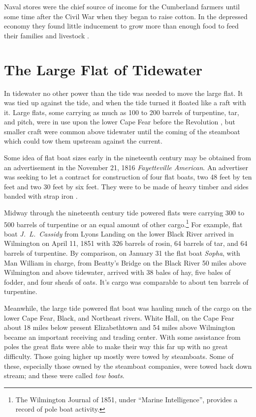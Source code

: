 \documentclass[11pt, a5paper, openright]{book}
\begin{document}
Naval stores were the chief source of income for the Cumberland
farmers until some time after the Civil War when they began to raise
cotton.  In the depressed economy they found little inducement to grow
more than enough food to feed their families and livestock
\citep[432]{oatesja}.\par

\section{The Large Flat of Tidewater}

In tidewater no other power than the tide was needed to move the large
flat.  It was tied up against the tide, and when the tide turned it
floated like a raft with it.  Large flats, some carrying as much as 100
to 200 barrels of turpentine, tar, and pitch, were in use upon the
lower Cape Fear before the Revolution \citep[184-185]{schawj}, but
smaller craft were common above tidewater until the coming of the
steamboat which could tow them upstream against the current.\par

Some idea of flat boat sizes early in the nineteenth century may be
obtained from an advertisement in the November 21, 1816
\textit{Fayetteville American}.  An advertiser was seeking to let a
contract for construction of four flat boats, two 48 feet by ten feet
and two 30 feet by six feet.  They were to be made of heavy timber and
sides banded with strap iron \citep[11-21-16]{fa}.\par

Midway through the nineteenth century tide powered flats were carrying
300 to 500 barrels of turpentine or an equal amount of other
cargo.\footnote{The Wilmington Journal of 1851, under ``Marine
  Intelligence'', provides a record of pole boat activity.}  For
example, flat boat
\textit{J.~L.~Cassidy} from Lyons
Landing on the lower Black River arrived in Wilmington on April 11,
1851 with 326 barrels of rosin, 64 barrels of tar, and 64 barrels
of turpentine.  By comparison, on January 31 the flat boat
\textit{Sopha}, with Man William in charge, from Beatty's Bridge on
the Black River 50 miles above Wilmington and above tidewater, arrived
with 38 bales of hay, five bales of fodder, and four sheafs of oats.
It's cargo was comparable to about ten barrels of turpentine.\par

Meanwhile, the large tide powered flat boat was hauling much of the
cargo on the lower Cape Fear, Black, and Northeast rivers.  White
Hall, on the Cape Fear about 18 miles below present Elizabethtown and
54 miles above Wilmington became an important receiving and trading
center.  With some assistance from poles the great flats were able to
make their way this far up with no great difficulty.  Those going
higher up mostly were towed by steamboats.  Some of these, especially
those owned by the steamboat companies, were towed back down stream;
and these were called \textit{tow boats}.\par
\end{document}

